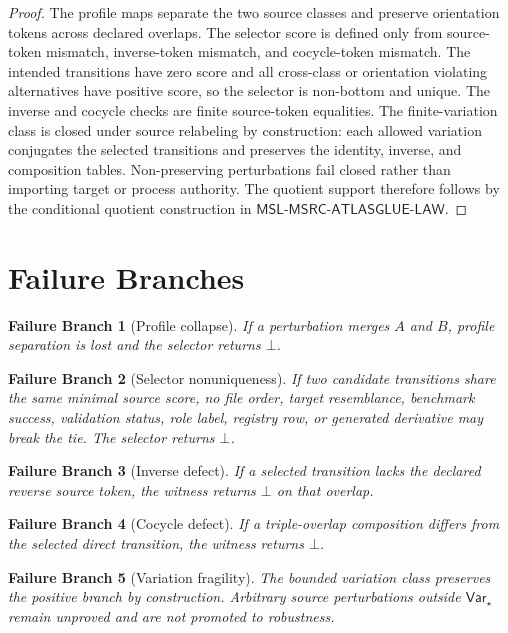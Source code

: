 \documentclass[11pt]{article}
\newcommand{\MSL}{\mathsf{MSL}\mbox{-}\mathsf{MSRC}\mbox{-}\mathsf{ATLASGLUE}\mbox{-}\mathsf{LAW}}
\newcommand{\Bot}{\bot}
\newcommand{\Varstar}{\mathsf{Var}_{\star}}
\newtheorem{failure}{Failure Branch}
\begin{document}
\begin{proof}
The profile maps separate the two source classes and preserve orientation
tokens across declared overlaps. The selector score is defined only from
source-token mismatch, inverse-token mismatch, and cocycle-token mismatch.
The intended transitions have zero score and all cross-class or orientation
violating alternatives have positive score, so the selector is non-bottom and
unique. The inverse and cocycle checks are finite source-token equalities.
The finite-variation class is closed under source relabeling by construction:
each allowed variation conjugates the selected transitions and preserves the
identity, inverse, and composition tables. Non-preserving perturbations fail
closed rather than importing target or process authority. The quotient support
therefore follows by the conditional quotient construction in \(\MSL\).
\end{proof}

\section{Failure Branches}

\begin{failure}[Profile collapse]
If a perturbation merges \(A\) and \(B\), profile separation is lost and the
selector returns \(\Bot\).
\end{failure}

\begin{failure}[Selector nonuniqueness]
If two candidate transitions share the same minimal source score, no file
order, target resemblance, benchmark success, validation status, role label,
registry row, or generated derivative may break the tie. The selector returns
\(\Bot\).
\end{failure}

\begin{failure}[Inverse defect]
If a selected transition lacks the declared reverse source token, the witness
returns \(\Bot\) on that overlap.
\end{failure}

\begin{failure}[Cocycle defect]
If a triple-overlap composition differs from the selected direct transition,
the witness returns \(\Bot\).
\end{failure}

\begin{failure}[Variation fragility]
The bounded variation class preserves the positive branch by construction.
Arbitrary source perturbations outside \(\Varstar\) remain unproved and are
not promoted to robustness.
\end{failure}
\end{document}

